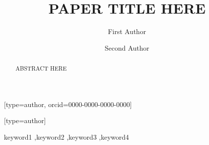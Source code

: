 \documentclass[a4paper,fleqn]{cas-sc}
\begin{document}
\let\WriteBookmarks\relax
\def\floatpagepagefraction{1}
\def\textpagefraction{.001}


\title[mode=title]{PAPER TITLE HERE}

\author[1]{First Author}[type=author,
  orcid=0000-0000-0000-0000]
\cormark[1]

\author[2]{Second Author}[type=author]

\address[1]{Department, University, City, Country}
\address[2]{Department, University, City, Country}


\begin{abstract}
ABSTRACT HERE
\end{abstract}

\begin{keywords}
keyword1 \sep keyword2 \sep keyword3 \sep keyword4
\end{keywords}

\maketitle









\end{document}
